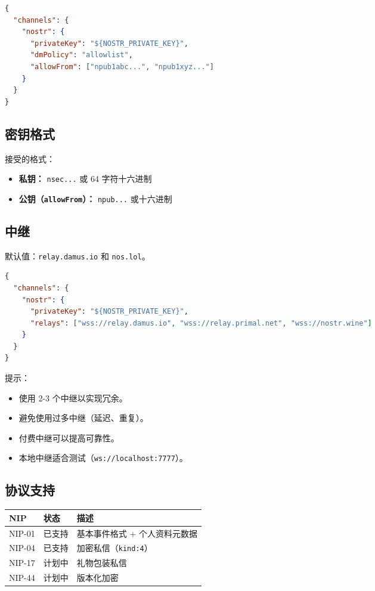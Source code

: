 \begin{lstlisting}[language=json]
{
  "channels": {
    "nostr": {
      "privateKey": "${NOSTR_PRIVATE_KEY}",
      "dmPolicy": "allowlist",
      "allowFrom": ["npub1abc...", "npub1xyz..."]
    }
  }
}
\end{lstlisting}


\subsection{密钥格式}


接受的格式：

\begin{itemize}
  \item \textbf{私钥：} \texttt{nsec...} 或 64 字符十六进制
  \item \textbf{公钥（\texttt{allowFrom}）：} \texttt{npub...} 或十六进制
\end{itemize}


\subsection{中继}


默认值：\texttt{relay.damus.io} 和 \texttt{nos.lol}。

\begin{lstlisting}[language=json]
{
  "channels": {
    "nostr": {
      "privateKey": "${NOSTR_PRIVATE_KEY}",
      "relays": ["wss://relay.damus.io", "wss://relay.primal.net", "wss://nostr.wine"]
    }
  }
}
\end{lstlisting}


提示：

\begin{itemize}
  \item 使用 2-3 个中继以实现冗余。
  \item 避免使用过多中继（延迟、重复）。
  \item 付费中继可以提高可靠性。
  \item 本地中继适合测试（\texttt{ws://localhost:7777}）。
\end{itemize}


\subsection{协议支持}



\begin{table}[h]
\centering
\small
\begin{tabular}{|l|l|l|}
\hline
NIP & 状态 & 描述 \\
\hline
NIP-01 & 已支持 & 基本事件格式 + 个人资料元数据 \\
\hline
NIP-04 & 已支持 & 加密私信（\texttt{kind:4}） \\
\hline
NIP-17 & 计划中 & 礼物包装私信 \\
\hline
NIP-44 & 计划中 & 版本化加密 \\
\hline
\end{tabular}
\end{table}



